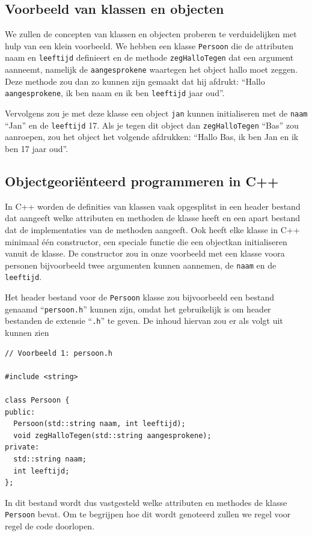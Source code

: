 \documentclass{article}
\begin{document}
\subsection{Voorbeeld van klassen en objecten}
We zullen de concepten van klassen en objecten proberen te verduidelijken met hulp van een klein voorbeeld. We hebben een klasse \texttt{Persoon} die de attributen naam en \texttt{leeftijd} definieert en de methode \texttt{zegHalloTegen} dat een argument aanneemt, namelijk de \texttt{aangesprokene} waartegen het object hallo moet zeggen. Deze methode zou dan zo kunnen zijn gemaakt dat hij afdrukt: “Hallo \texttt{aangesprokene}, ik ben naam en ik ben \texttt{leeftijd} jaar oud”.


Vervolgens zou je met deze klasse een object \texttt{jan} kunnen initialiseren met de \texttt{naam} “Jan” en de \texttt{leeftijd} 17. Als je tegen dit object dan \texttt{zegHalloTegen} “Bas” zou aanroepen, zou het object het volgende afdrukken: “Hallo Bas, ik ben Jan en ik ben 17 jaar oud”.

\subsection{Objectgeoriënteerd programmeren in C++}
In C++ worden de definities van klassen vaak opgesplitst in een header bestand dat aangeeft welke attributen en methoden de klasse heeft en een apart bestand dat de implementaties van de methoden aangeeft. Ook heeft elke klasse in C++ minimaal één constructor, een speciale functie die een objectkan initialiseren vanuit de klasse. De constructor zou in onze voorbeeld met een klasse voora personen bijvoorbeeld twee argumenten kunnen aannemen, de \texttt{naam} en de \texttt{leeftijd}.

Het header bestand voor de \texttt{Persoon} klasse zou bijvoorbeeld een bestand genaamd “\texttt{persoon.h}” kunnen zijn, omdat het gebruikelijk is om header bestanden de extensie “\texttt{.h}” te geven. De inhoud hiervan zou er als volgt uit kunnen zien

\begin{lstlisting}
// Voorbeeld 1: persoon.h

#include <string>

class Persoon {
public:
  Persoon(std::string naam, int leeftijd);
  void zegHalloTegen(std::string aangesprokene);
private:
  std::string naam;
  int leeftijd;
};
\end{lstlisting}

In dit bestand wordt dus vastgesteld welke attributen en methodes de klasse \texttt{Persoon} bevat. Om te begrijpen hoe dit wordt genoteerd zullen we regel voor regel de code doorlopen.
\end{document}
